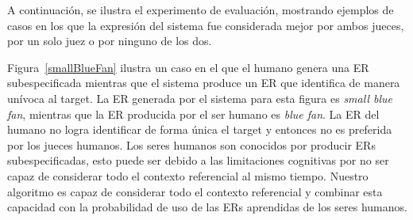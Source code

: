 A continuaci\'on, se ilustra el experimento de evaluaci\'on, mostrando ejemplos de casos en los que la expresi\'on del sistema fue considerada mejor por ambos jueces, por un solo juez o por ninguno de los dos.

Figura~\ref{smallBlueFan} ilustra un caso en el que el humano genera una ER subespecificada mientras que el sistema produce un ER que identifica de manera un\'{i}voca al target. La ER generada por el sistema para esta figura es {\it small blue fan}, mientras que la ER producida por el ser humano es {\it blue fan}. La ER del humano no logra identificar de forma \'unica el target y entonces no es preferida por los jueces humanos. Los seres humanos son conocidos por producir ERs subespecificadas, esto puede ser debido a las limitaciones cognitivas por no ser capaz de considerar todo el contexto referencial al mismo tiempo. Nuestro algoritmo es capaz de considerar todo el contexto referencial y combinar esta capacidad con la probabilidad de uso de las ERs aprendidas de los seres humanos.

